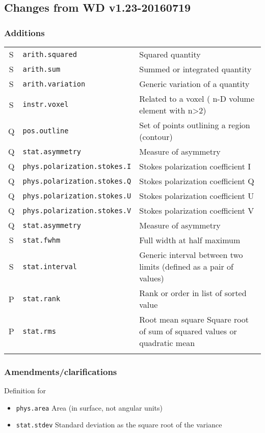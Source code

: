 \documentclass[11pt,a4paper]{ivoa}
\begin{document}
\subsection{Changes from WD v1.23-20160719}
\subsubsection*{Additions}
\footnotesize\begin{longtable}[h!]{c|p{40ex}|p{}}
\sptablerule
S & {\tt arith.squared} & Squared quantity\\
S & {\tt arith.sum} & Summed or integrated quantity\\
S & {\tt arith.variation} & Generic variation of a quantity\\
S & {\tt instr.voxel} & Related to a voxel ( n-D volume element with n>2)\\
Q & {\tt pos.outline} & Set of points outlining a region (contour)\\
Q & {\tt stat.asymmetry} & Measure of asymmetry\\
Q & {\tt phys.polarization.stokes.I} & Stokes polarization coefficient I\\
Q & {\tt phys.polarization.stokes.Q} & Stokes polarization coefficient Q\\
Q & {\tt phys.polarization.stokes.U} & Stokes polarization coefficient U\\
Q & {\tt phys.polarization.stokes.V} & Stokes polarization coefficient V\\
Q & {\tt stat.asymmetry} & Measure of asymmetry\\
S & {\tt stat.fwhm} & Full width at half maximum\\
S & {\tt stat.interval} & Generic interval between two limits (defined as a pair of values)\\
P & {\tt stat.rank} & Rank or order in list of sorted value\\
P & {\tt stat.rms} & Root mean square  Square root of sum of squared values or quadratic mean\\
\sptablerule
\end{longtable}

\subsubsection*{Amendments/clarifications}
Definition for 
\begin{itemize}
\item {\tt phys.area} Area (in surface, not angular units)
\item {\tt stat.stdev} Standard deviation as the square root of the variance                                                           
\end{itemize}
\end{document}
